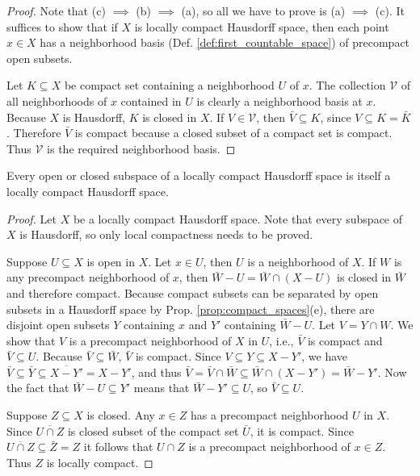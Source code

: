\documentclass[11pt,a4paper]{article}
\begin{document}
\begin{proof}
Note that {(c)} $\implies$ {(b)} $\implies$ {(a)}, so all we have to prove is {(a)} $\implies$ {(c)}. It suffices to show that if $X$ is locally compact Hausdorff space, then each point $x\in X$ has a {neighborhood basis} (Def. \ref{def:first_countable_space}) of precompact open subsets. 

Let $K\subseteq X$ be compact set containing a neighborhood $U$ of $x$. The collection $\mathcal{V}$ of all neighborhoods of $x$ contained in $U$ is clearly a neighborhood basis at $x$. Because $X$ is Hausdorff, $K$ is closed in $X$. If $V\in \mathcal{V}$, then $\bar{V}\subseteq K$, since $V\subseteq K = \bar{K}$. Therefore $\bar{V}$ is compact because a closed subset of a compact set is compact. Thus $\mathcal{V}$ is the required neighborhood basis.
\end{proof}

\begin{proposition}
Every open or closed subspace of a locally compact Hausdorff space is itself a locally compact Hausdorff space.
\end{proposition}

\begin{proof}
Let $X$ be a locally compact Hausdorff space. Note that every subspace of $X$ is Hausdorff, so only local compactness needs to be proved.

Suppose $U\subseteq X$ is open in $X$. Let $x\in U$, then $U$ is a neighborhood of $X$. If $W$ is any precompact neighborhood of $x$, then $\bar{W}-U = \bar{W}\cap (X - U)$ is closed in $\bar{W}$ and therefore compact. Because compact subsets can be separated by open subsets in a Hausdorff space by Prop. \ref{prop:compact_spaces}(e), there are disjoint open subsets $Y$ containing $x$ and $Y'$ containing $\bar{W}-U$. Let $V = Y\cap W$. We show that $V$ is a precompact neighborhood of $X$ in $U$, i.e., $\bar{V}$ is compact and $\bar{V}\subseteq U$. Because $\bar{V}\subseteq \bar{W}$, $\bar{V}$ is compact. Since $V\subseteq Y\subseteq X-Y'$, we have $\bar{V}\subseteq \bar{Y}\subseteq \overline{X-Y'} = X - Y'$, and thus $\bar{V} = \bar{V}\cap \bar{W}\subseteq \bar{W}\cap (X-Y') = \bar{W}-Y'$. Now the fact that $\bar{W}-U\subseteq Y'$ means that $\bar{W}-Y'\subseteq U$, so $\bar{V}\subseteq U$.

Suppose $Z\subseteq X$ is closed. Any $x\in Z$ has a precompact neighborhood $U$ in $X$. Since $\overline{U\cap Z}$ is closed subset of the compact set $\bar{U}$, it is compact. Since $\overline{U\cap Z}\subseteq \bar Z = Z$ it follows that $U\cap Z$ is a precompact neighborhood of $x\in Z$. Thus $Z$ is locally compact.
\end{proof}
\end{document}
